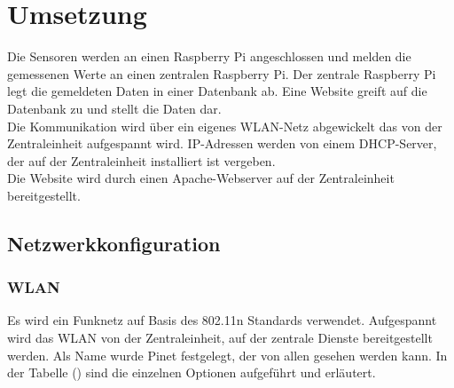 \chapter{Umsetzung}

Die Sensoren werden an einen Raspberry Pi angeschlossen und melden die
gemessenen Werte an einen zentralen Raspberry Pi. Der zentrale Raspberry Pi legt
die gemeldeten Daten in einer Datenbank ab. Eine Website greift auf die
Datenbank zu und stellt die Daten dar.\\
Die Kommunikation wird über ein eigenes WLAN-Netz abgewickelt das von der
Zentraleinheit aufgespannt wird. IP-Adressen werden von einem \ac{DHCP}-Server, der
auf der Zentraleinheit installiert ist vergeben.\\
Die Website wird durch einen Apache-Webserver auf der Zentraleinheit
bereitgestellt.

\section{Netzwerkkonfiguration}
\subsection{WLAN}
Es wird ein Funknetz auf Basis des 802.11n Standards verwendet. Aufgespannt wird das WLAN von der Zentraleinheit, auf der zentrale Dienste bereitgestellt werden. Als Name wurde Pinet festgelegt, der von allen gesehen werden kann. In der Tabelle () sind die einzelnen Optionen aufgeführt und erläutert.


